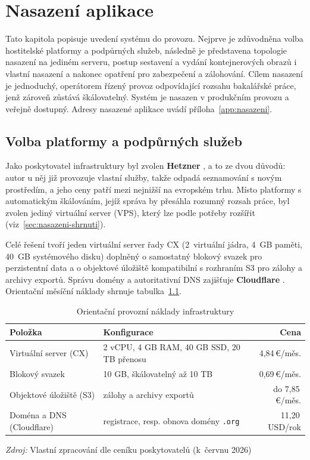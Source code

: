 \chapter{Nasazení aplikace}
\label{ch:nasazeni}

Tato kapitola popisuje uvedení systému do provozu. Nejprve je zdůvodněna volba hostitelské platformy a podpůrných služeb, následně je představena topologie nasazení na jediném serveru, postup sestavení a vydání kontejnerových obrazů i vlastní nasazení a nakonec opatření pro zabezpečení a zálohování. Cílem nasazení je jednoduchý, operátorem řízený provoz odpovídající rozsahu bakalářské práce, jenž zároveň zůstává škálovatelný. Systém je nasazen v produkčním provozu a veřejně dostupný. Adresy nasazené aplikace uvádí příloha~\ref{app:nasazeni}.

\section{Volba platformy a podpůrných služeb}
\label{sec:nasazeni-platforma}

Jako poskytovatel infrastruktury byl zvolen \textbf{Hetzner} \parencite{hetznerCloud}, a to ze dvou důvodů: autor u něj již provozuje vlastní služby, takže odpadá seznamování s novým prostředím, a jeho ceny patří mezi nejnižší na evropském trhu. Místo platformy s automatickým škálováním, jejíž správa by přesáhla rozumný rozsah práce, byl zvolen jediný virtuální server (VPS), který lze podle potřeby rozšířit (viz~\ref{sec:nasazeni-shrnuti}).

Celé řešení tvoří jeden virtuální server řady CX (2~virtuální jádra, 4~GB paměti, 40~GB systémového disku) doplněný o samostatný blokový svazek pro perzistentní data a o objektové úložiště kompatibilní s rozhraním S3 pro zálohy a archivy exportů. Správu domény a autoritativní DNS zajišťuje \textbf{Cloudflare} \parencite{cloudflareDNS}. Orientační měsíční náklady shrnuje tabulka~\ref{tab:naklady}.

\begin{table}[htbp]
\caption{Orientační provozní náklady infrastruktury}
\label{tab:naklady}
\centering
\medskip
{\footnotesize
\begin{tabular}{@{}l p{5.2cm} r@{}}
\hline
\textbf{Položka} & \textbf{Konfigurace} & \textbf{Cena} \\
\hline
Virtuální server (CX) & 2 vCPU, 4 GB RAM, 40 GB SSD, 20 TB přenosu & 4,84\,€/měs. \\
Blokový svazek & 10 GB, škálovatelný až 10 TB & 0,69\,€/měs. \\
Objektové úložiště (S3) & zálohy a archivy exportů & do 7,85\,€/měs. \\
Doména a DNS (Cloudflare) & registrace, resp. obnova domény \texttt{.org} & 11,20\,USD/rok \\
\hline
\end{tabular}}

{\footnotesize \textit{Zdroj:} Vlastní zpracování dle ceníku poskytovatelů (k~červnu 2026)}
\end{table}

